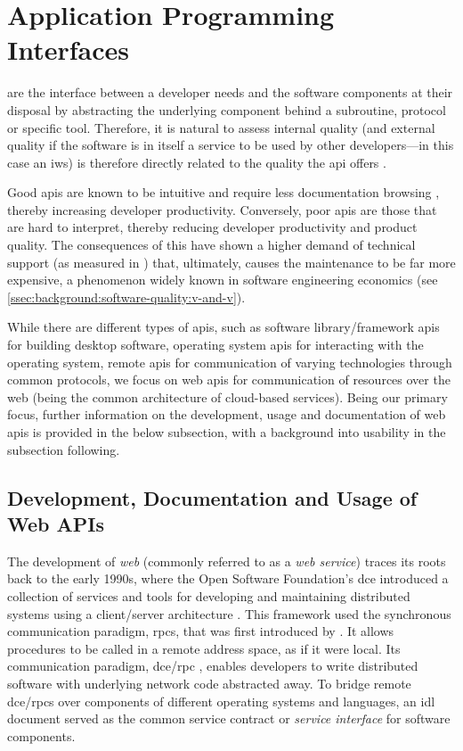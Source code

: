 \section{Application Programming Interfaces}
\label{sec:background:api}

 are the interface between a developer needs and the software components at their disposal \citep{Arnold:2005vc} by abstracting the underlying component behind a subroutine, protocol or specific tool. Therefore, it is natural to assess internal quality (and external quality if the software is in itself a service to be used by other developers---in this case an \gls{iws}) is therefore directly related to the quality the \gls{api} offers \citep{Ko:2004td}. 

Good \glspl{api} are known to be intuitive and require less documentation browsing \citep{Piccioni:2013em}, thereby increasing developer productivity. Conversely, poor \glspl{api} are those that are hard to interpret, thereby reducing developer productivity and product quality. The consequences of this have shown a higher demand of technical support (as measured in \citep{Henning:2009hz}) that, ultimately, causes the maintenance to be far more expensive, a phenomenon widely known in software engineering economics (see \cref{ssec:background:software-quality:v-and-v}).

While there are different types of \glspl{api}, such as software library/framework \glspl{api} for building desktop software, operating system \glspl{api} for interacting with the operating system, remote \glspl{api} for communication of varying technologies through common protocols, we focus on web \glspl{api} for communication of resources over the web (being the common architecture of cloud-based services). Being our primary focus, further information on the development, usage and documentation of web \glspl{api} is provided in the below subsection, with a background into  usability in the subsection following.

\subsection{Development, Documentation and Usage of Web APIs}
\label{ssec:background:api:usage}

The development of \textit{web } (commonly referred to as a \textit{web service}) traces its roots back to the early 1990s, where  the Open Software Foundation's \gls{dce} introduced a collection of services and tools for developing and maintaining distributed systems using a client/server architecture \citep{Rosenberry:1992up}. This framework used the synchronous communication paradigm, \glspl{rpc}, that was first introduced by \citet{Nelson:1981ue}. It allows procedures to be called in a remote address space, as if it were local. Its communication paradigm, \gls{dce}/\gls{rpc} \citep{OpenSoftwareFoundation:1991vp}, enables developers to write distributed software with underlying network code abstracted away. To bridge remote \gls{dce}/\glspl{rpc} over components of different operating systems and languages, an \gls{idl} document served as the common service contract or \textit{service interface} for software components. 

